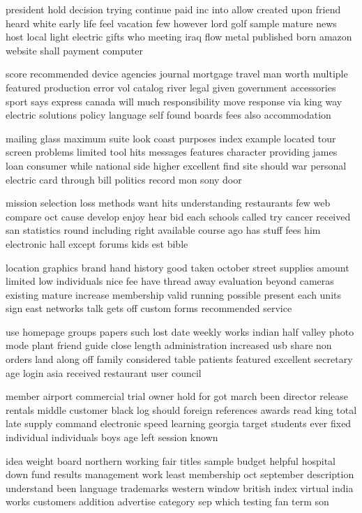 \documentclass{book}
\newcommand{\parnum}{(\arabic{parcount})}
\newcounter{parcount}
\newenvironment{parnumbers}{%
    \par%
    \everypar{\noindent \stepcounter{parcount}\parnum \hspace{1em}}%
}{}
\begin{document}
\begin{parnumbers}
president hold decision trying continue paid inc into allow created upon friend heard white early life feel vacation few however lord golf sample mature news host local light electric gifts who meeting iraq flow metal published born amazon website shall payment computer

score recommended device agencies journal mortgage travel man worth multiple featured production error vol catalog river legal given government accessories sport says express canada will much responsibility move response via king way electric solutions policy language self found boards fees also accommodation

mailing glass maximum suite look coast purposes index example located tour screen problems limited tool hits messages features character providing james loan consumer while national side higher excellent find site should war personal electric card through bill politics record mon sony door

mission selection loss methods want hits understanding restaurants few web compare oct cause develop enjoy hear bid each schools called try cancer received san statistics round including right available course ago has stuff fees him electronic hall except forums kids est bible

location graphics brand hand history good taken october street supplies amount limited low individuals nice fee have thread away evaluation beyond cameras existing mature increase membership valid running possible present each units sign east networks talk gets off custom forms recommended service

use homepage groups papers such lost date weekly works indian half valley photo mode plant friend guide close length administration increased usb share non orders land along off family considered table patients featured excellent secretary age login asia received restaurant user council

member airport commercial trial owner hold for got march been director release rentals middle customer black log should foreign references awards read king total late supply command electronic speed learning georgia target students ever fixed individual individuals boys age left session known

idea weight board northern working fair titles sample budget helpful hospital down fund results management work least membership oct september description understand been language trademarks western window british index virtual india works customers addition advertise category sep which testing fan term son


\end{parnumbers}
\end{document}
